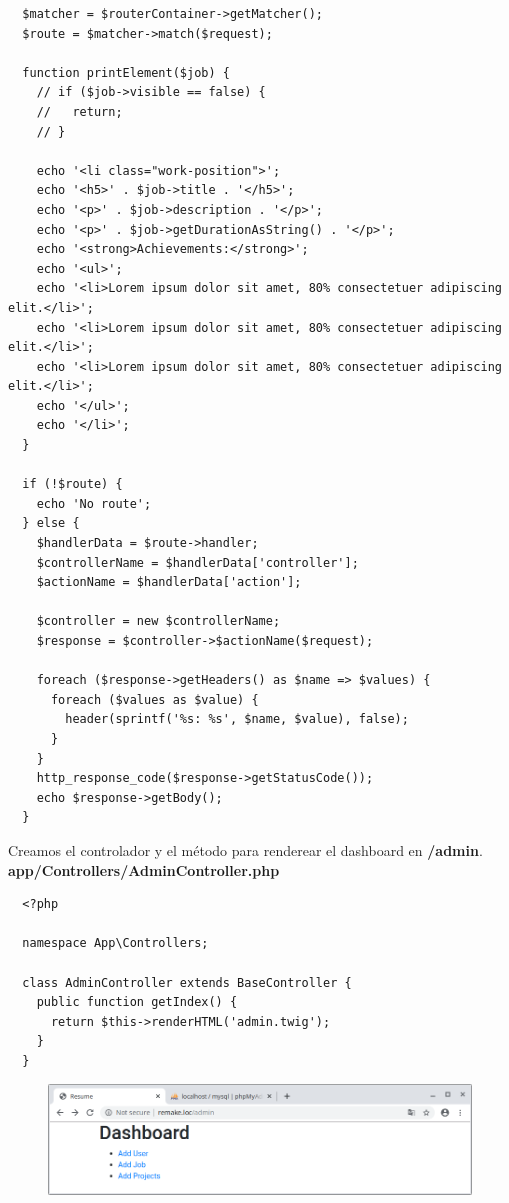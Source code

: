 \documentclass{article}
\begin{document}
\begin{verbatim}
  $matcher = $routerContainer->getMatcher();
  $route = $matcher->match($request);

  function printElement($job) {
    // if ($job->visible == false) {
    //   return;
    // }

    echo '<li class="work-position">';
    echo '<h5>' . $job->title . '</h5>';
    echo '<p>' . $job->description . '</p>';
    echo '<p>' . $job->getDurationAsString() . '</p>';
    echo '<strong>Achievements:</strong>';
    echo '<ul>';
    echo '<li>Lorem ipsum dolor sit amet, 80% consectetuer adipiscing elit.</li>';
    echo '<li>Lorem ipsum dolor sit amet, 80% consectetuer adipiscing elit.</li>';
    echo '<li>Lorem ipsum dolor sit amet, 80% consectetuer adipiscing elit.</li>';
    echo '</ul>';
    echo '</li>';
  }

  if (!$route) {
    echo 'No route';
  } else {
    $handlerData = $route->handler;
    $controllerName = $handlerData['controller'];
    $actionName = $handlerData['action'];

    $controller = new $controllerName;
    $response = $controller->$actionName($request);

    foreach ($response->getHeaders() as $name => $values) {
      foreach ($values as $value) {
        header(sprintf('%s: %s', $name, $value), false);
      }
    }
    http_response_code($response->getStatusCode());
    echo $response->getBody();
  }
\end{verbatim}

Creamos el controlador y el método para renderear el dashboard en
\textbf{/admin}.\\

\textbf{app/Controllers/AdminController.php}
\begin{verbatim}
  <?php

  namespace App\Controllers;

  class AdminController extends BaseController {
    public function getIndex() {
      return $this->renderHTML('admin.twig');
    }
  }
\end{verbatim}

\newpage

\begin{figure}[h!]
  \centering
  \includegraphics[scale=0.5]{./Pictures/212_dashboard_free.png}
\end{figure}
\end{document}
